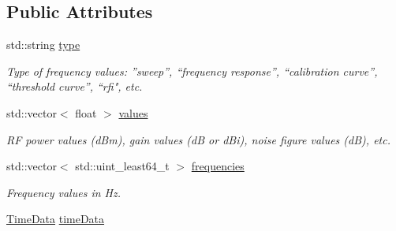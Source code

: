 \subsection*{Public Attributes}
\begin{DoxyCompactItemize}
\item 
\mbox{\label{structFreqValues_a457f391fad53ee1e8bca839dde90c5f1}} 
std\+::string \hyperlink{structFreqValues_a457f391fad53ee1e8bca839dde90c5f1}{type}
\begin{DoxyCompactList}\small\item\em Type of frequency values\+: ”sweep”, “frequency response”, “calibration curve”, “threshold curve”, “rfi", etc. \end{DoxyCompactList}\item 
\mbox{\label{structFreqValues_a07669bbe3b65cbfb80300631ce85fb76}} 
std\+::vector$<$ float $>$ \hyperlink{structFreqValues_a07669bbe3b65cbfb80300631ce85fb76}{values}
\begin{DoxyCompactList}\small\item\em RF power values (d\+Bm), gain values (dB or d\+Bi), noise figure values (dB), etc. \end{DoxyCompactList}\item 
\mbox{\label{structFreqValues_a2b625831a46019f93a0999c1bed5c3a0}} 
std\+::vector$<$ std\+::uint\+\_\+least64\+\_\+t $>$ \hyperlink{structFreqValues_a2b625831a46019f93a0999c1bed5c3a0}{frequencies}
\begin{DoxyCompactList}\small\item\em Frequency values in Hz. \end{DoxyCompactList}\item 
\hyperlink{structTimeData}{Time\+Data} \hyperlink{structFreqValues_a4c97a4710c83078f5af5d92f2bedfe61}{time\+Data}
\end{DoxyCompactItemize}
